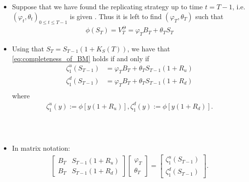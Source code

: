 \documentclass{beamer}
\numberwithin{equation}{section}
\begin{document}
\begin{frame}\frametitle{{\normalsize \secname} \\ {\large \subsecname}}
    \begin{itemize}
        \item <1-> Suppose that we have found the replicating strategy up to time $t = T-1$, i.e. $(\varphi_t, \theta_t)_{0 \leq t \leq T-1}$ is given . Thus it is left to find $(\varphi_T, \theta_T)$ such that 
        \begin{align}\label{eq:completeness_of_BM}
            \phi(S_T) = V_T^{\Theta} = \varphi_TB_T + \theta_TS_T
        \end{align}
                \item <1-> Using that $S_T = S_{T-1}(1+K_S(T))$, we have that \eqref{eq:completeness_of_BM} holds if and only if 
                \begin{align*}
            \zeta^u_1(S_{T-1}) &= \varphi_T B_T  + \theta_T S_{T-1}(1+R_u)\\
            \zeta^d_1(S_{T-1}) &= \varphi_T B_T  + \theta_T S_{T-1}(1+R_d)\\
        \end{align*}
        where
        \begin{align*}
            \zeta_1^u(y) := \phi[y(1 + R_u)], \zeta_1^d(y):= \phi[y(1 + R_d)]. 
        \end{align*}
    \end{itemize}
\end{frame}

\begin{frame}\frametitle{{\normalsize \secname} \\ {\large \subsecname}}
    \begin{itemize}
        \item <1-> In matrix notation: 
        \begin{align*}
            \begin{bmatrix} B_T & S_{T-1}(1 + R_u)\\ B_T & S_{T-1}(1 + R_d)\end{bmatrix} \begin{bmatrix} \varphi_T \\ \theta_T \end{bmatrix} = \begin{bmatrix} \zeta^u_1 (S_{T-1})\\ \zeta^d_1(S_{T-1})\end{bmatrix}. 
        \end{align*}
    \end{itemize}
\end{frame}
\end{document}
